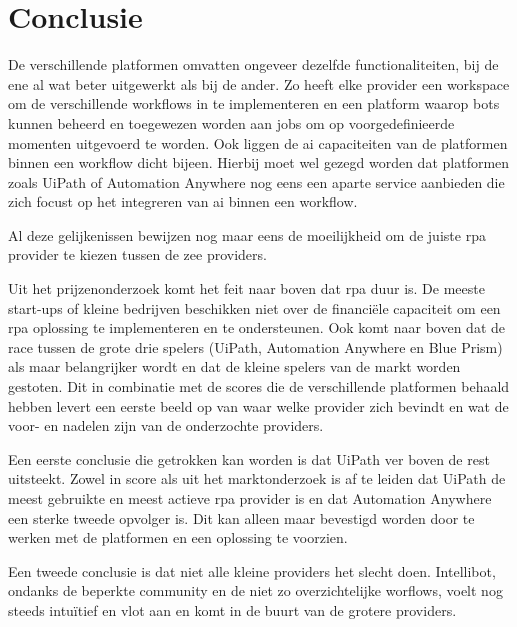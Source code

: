 \chapter{Conclusie}
\label{ch:conclusie}
De verschillende platformen omvatten ongeveer dezelfde functionaliteiten, bij de ene al wat beter uitgewerkt als bij de ander. Zo heeft elke provider een workspace om de verschillende \gls{workflow}s in te implementeren en een platform waarop bots kunnen beheerd en toegewezen worden aan jobs om op voorgedefinieerde momenten uitgevoerd te worden. Ook liggen de \acrshort{ai} capaciteiten van de platformen binnen een \gls{workflow} dicht bijeen. Hierbij moet wel gezegd worden dat platformen zoals UiPath of Automation Anywhere nog eens een aparte service aanbieden die zich focust op het integreren van \acrshort{ai} binnen een \gls{workflow}.

Al deze gelijkenissen bewijzen nog maar eens de moeilijkheid om de juiste \acrshort{rpa} provider te kiezen tussen de zee providers.

Uit het prijzenonderzoek komt het feit naar boven dat \acrshort{rpa} duur is. De meeste start-ups of kleine bedrijven beschikken niet over de financiële capaciteit om een \acrshort{rpa} oplossing te implementeren en te ondersteunen. Ook komt naar boven dat de race tussen de grote drie spelers (UiPath, Automation Anywhere en Blue Prism) als maar belangrijker wordt en dat de kleine spelers van de markt worden gestoten. Dit in combinatie met de scores die de verschillende platformen behaald hebben levert een eerste beeld op van waar welke provider zich bevindt en wat de voor- en nadelen zijn van de onderzochte providers.

Een eerste conclusie die getrokken kan worden is dat UiPath ver boven de rest uitsteekt. Zowel in score als uit het marktonderzoek is af te leiden dat UiPath de meest gebruikte en meest actieve \acrshort{rpa} provider is en dat Automation Anywhere een sterke tweede opvolger is. Dit kan alleen maar bevestigd worden door te werken met de platformen en een oplossing te voorzien.

Een tweede conclusie is dat niet alle kleine providers het slecht doen. Intellibot, ondanks de beperkte community en de niet zo overzichtelijke worflows, voelt nog steeds intuïtief en vlot aan en komt in de buurt van de grotere providers.

